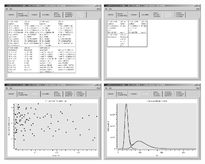 \begin{figure}[htb]
\begin{center}
\includegraphics[width=0.45\textwidth,height=0.3\textwidth]{tab1.png}
\includegraphics[width=0.45\textwidth,height=0.3\textwidth]{tab2.png}
\includegraphics[width=0.45\textwidth,height=0.3\textwidth]{tab3.png}
\includegraphics[width=0.45\textwidth,height=0.3\textwidth]{tab4.png}
\end{center}
\caption{} \label{tabs}
\end{figure}
